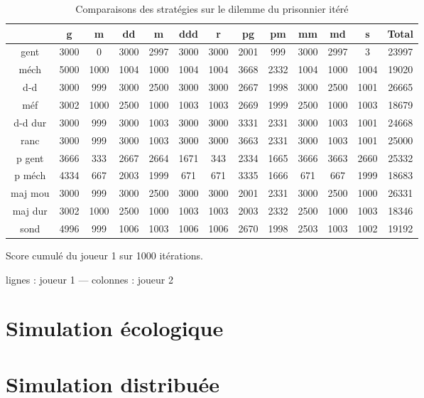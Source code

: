 \documentclass[10pt]{article}
\begin{document}
\begin{table}
\caption[Comparaison des stratégies]{Comparaisons des stratégies sur le dilemme du prisonnier itéré}
\label{strattable}
\begin{center}
\begin{tabular}{|c|cccccccccccc|}
\hline
& g & m & dd & m & ddd & r & pg & pm & mm & md & s & Total \\ \hline
gent & 3000& 0& 3000& 2997& 3000& 3000& 2001& 999& 3000& 2997& 3& 23997\\
méch & 5000& 1000& 1004& 1000& 1004& 1004& 3668& 2332& 1004& 1000& 1004& 19020\\
d-d & 3000& 999& 3000& 2500& 3000& 3000& 2667& 1998& 3000& 2500& 1001& 26665\\
méf & 3002& 1000& 2500& 1000& 1003& 1003& 2669& 1999& 2500& 1000& 1003& 18679\\
d-d dur & 3000& 999& 3000& 1003& 3000& 3000& 3331& 2331& 3000& 1003& 1001& 24668\\
ranc & 3000& 999& 3000& 1003& 3000& 3000& 3663& 2331& 3000& 1003& 1001& 25000\\
p gent & 3666& 333& 2667& 2664& 1671& 343& 2334& 1665& 3666& 3663& 2660& 25332\\
p méch & 4334& 667& 2003& 1999& 671& 671& 3335& 1666& 671& 667& 1999& 18683\\
maj mou & 3000& 999& 3000& 2500& 3000& 3000& 2001& 2331& 3000& 2500& 1000& 26331\\
maj dur & 3002& 1000& 2500& 1000& 1003& 1003& 2003& 2332& 2500& 1000& 1003& 18346\\
sond & 4996& 999& 1006& 1003& 1006& 1006& 2670& 1998& 2503& 1003& 1002& 19192\\
\hline
\end{tabular}
\end{center}
Score cumulé du joueur 1 sur 1000 itérations.

lignes : joueur 1 --- colonnes : joueur 2
\end{table}

\section{Simulation écologique}

\section{Simulation distribuée}
\end{document}
